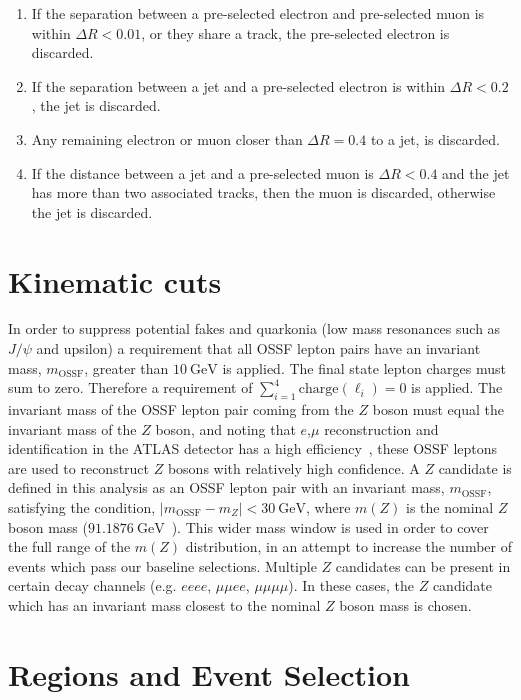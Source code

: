 \begin{enumerate}
\item If the separation between a pre-selected electron and pre-selected muon is within $\Delta R < 0.01$, or they share a track, the pre-selected electron is discarded.
\item If the separation between a jet and a pre-selected electron is within $\Delta R < 0.2$, the jet is discarded.
\item Any remaining electron or muon closer than $\Delta R = 0.4$ to a jet, is discarded.
\item If the distance between a jet and a pre-selected muon is $\Delta R < 0.4$ and the jet has more than two associated tracks, then the muon is discarded, otherwise the jet is discarded.
\end{enumerate}

\section{Kinematic cuts}
In order to suppress potential fakes and quarkonia (low mass resonances such as $J/\psi$ and upsilon) a requirement that all OSSF lepton pairs have an invariant mass, $m_{\text{OSSF}}$, greater than $\SI{10}{\GeV}$ is applied. The final state lepton charges must sum to zero. Therefore a requirement of $\sum_{i=1}^{4} \text{charge}(\ell_i) = 0$ is applied. The invariant mass of the OSSF lepton pair coming from the $Z$ boson must equal the invariant mass of the $Z$ boson, and noting that $e$,$\mu$ reconstruction and identification in the ATLAS detector has a high efficiency~\cite{Marchese:2688452}, these OSSF leptons are used to reconstruct $Z$ bosons with relatively high confidence. A $Z$ candidate is defined in this analysis as an OSSF lepton pair with an invariant mass, $m_{\text{OSSF}}$, satisfying the condition, $|m_{\text{OSSF}} - m_Z| <  \SI{30}{\GeV}$, where $m(Z)$ is the nominal $Z$ boson mass ($\SI{91.1876}{\GeV}$~\cite{pdg}). This wider mass window is used in order to cover the full range of the $m(Z)$ distribution, in an attempt to increase the number of events which pass our baseline selections. Multiple $Z$ candidates can be present in certain decay channels (e.g. $eeee$, $\mu\mu ee$, $\mu \mu \mu \mu$). In these cases, the $Z$ candidate which has an invariant mass closest to the nominal $Z$ boson mass is chosen. 
\section{Regions and Event Selection}
\label{sec:regionsAndEventSelection}

